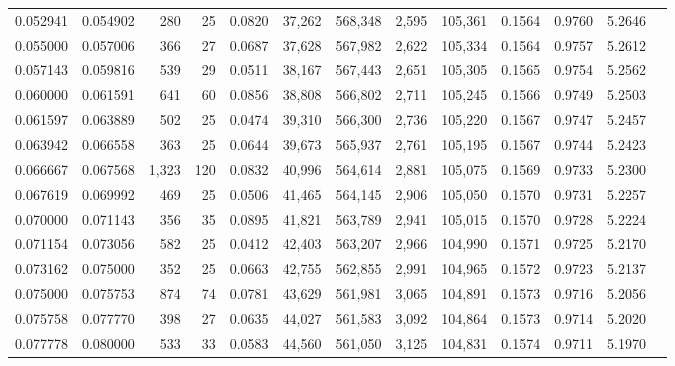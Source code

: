 \begin{tabular}{rrrrrrrrrrrrr}
0.052941 & 0.054902 &    280 &    25 &                                     0.0820 &  37,262 & 568,348 &   2,595 & 105,361 & 0.1564 & 0.9760 & 5.2646 \\
0.055000 & 0.057006 &    366 &    27 &                                     0.0687 &  37,628 & 567,982 &   2,622 & 105,334 & 0.1564 & 0.9757 & 5.2612 \\
0.057143 & 0.059816 &    539 &    29 &                                     0.0511 &  38,167 & 567,443 &   2,651 & 105,305 & 0.1565 & 0.9754 & 5.2562 \\
0.060000 & 0.061591 &    641 &    60 &                                     0.0856 &  38,808 & 566,802 &   2,711 & 105,245 & 0.1566 & 0.9749 & 5.2503 \\
0.061597 & 0.063889 &    502 &    25 &                                     0.0474 &  39,310 & 566,300 &   2,736 & 105,220 & 0.1567 & 0.9747 & 5.2457 \\
0.063942 & 0.066558 &    363 &    25 &                                     0.0644 &  39,673 & 565,937 &   2,761 & 105,195 & 0.1567 & 0.9744 & 5.2423 \\
0.066667 & 0.067568 &  1,323 &   120 &                                     0.0832 &  40,996 & 564,614 &   2,881 & 105,075 & 0.1569 & 0.9733 & 5.2300 \\
0.067619 & 0.069992 &    469 &    25 &                                     0.0506 &  41,465 & 564,145 &   2,906 & 105,050 & 0.1570 & 0.9731 & 5.2257 \\
0.070000 & 0.071143 &    356 &    35 &                                     0.0895 &  41,821 & 563,789 &   2,941 & 105,015 & 0.1570 & 0.9728 & 5.2224 \\
0.071154 & 0.073056 &    582 &    25 &                                     0.0412 &  42,403 & 563,207 &   2,966 & 104,990 & 0.1571 & 0.9725 & 5.2170 \\
0.073162 & 0.075000 &    352 &    25 &                                     0.0663 &  42,755 & 562,855 &   2,991 & 104,965 & 0.1572 & 0.9723 & 5.2137 \\
0.075000 & 0.075753 &    874 &    74 &                                     0.0781 &  43,629 & 561,981 &   3,065 & 104,891 & 0.1573 & 0.9716 & 5.2056 \\
0.075758 & 0.077770 &    398 &    27 &                                     0.0635 &  44,027 & 561,583 &   3,092 & 104,864 & 0.1573 & 0.9714 & 5.2020 \\
0.077778 & 0.080000 &    533 &    33 &                                     0.0583 &  44,560 & 561,050 &   3,125 & 104,831 & 0.1574 & 0.9711 & 5.1970 \\

\end{tabular}
